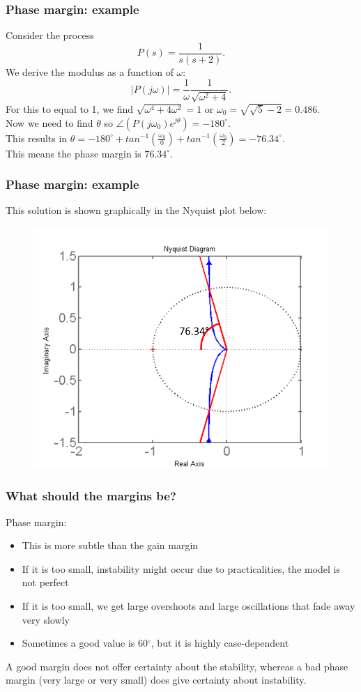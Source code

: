 \begin{frame}
	\frametitle{Phase margin: example}
	Consider the process \vspace{-2ex} $$P(s)=\frac{1}{s(s+2)}.$$
	We derive the modulus as a function of $\omega$: $$\big|P(j\omega)\big|=\frac{1}{\omega}\frac{1}{\sqrt{\omega^2+4}}.$$
	For this to equal to 1, we find $\sqrt{\omega^4+4\omega^2}=1$ or $\omega_0=\sqrt{\sqrt{5}-2}=0.486$.\\
	Now we need to find $\theta$ so $\angle(P(j\omega_0)e^{j\theta})=-180^{\circ}$.\\
	This results in $\theta = -180^{\circ}+tan^{-1}(\frac{\omega_0}{0})+tan^{-1}(\frac{\omega_0}{2})=-76.34^{\circ}$. \\
	This means the phase margin is $76.34^{\circ}$.
\end{frame}

\begin{frame}
	\frametitle{Phase margin: example}
	This solution is shown graphically in the Nyquist plot below:
	\begin{figure}
		\includegraphics[width=0.65\linewidth]{phase_example}
	\end{figure}
\end{frame}

\begin{frame}
	\frametitle{What should the margins be?}
	\vspace{-4ex}
	Phase margin:
	\begin{itemize}
		\item This is more subtle than the gain margin
		\item If it is too small, instability might occur due to practicalities, the model is not perfect
		\item If it is too small, we get large overshoots and large oscillations that fade away very slowly
		\item Sometimes a good value is 60$^{\circ}$, but it is highly case-dependent
	\end{itemize}
	\bigskip
	A good margin does not offer certainty about the stability, whereas a bad phase margin (very large or very small) does give certainty about instability.
\end{frame}

